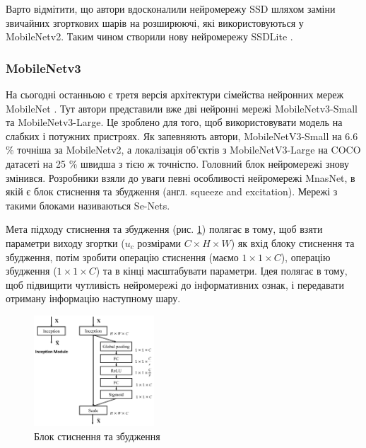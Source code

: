 Варто відмітити, що автори вдосконалили нейромережу SSD \cite{bib:ssd} шляхом заміни
звичайних згорткових шарів на розширюючі, які
використовуються у MobileNetv2. Таким чином створили нову нейромережу SSDLite \cite{bib:mobilenet:v2}.

\subsubsection{MobileNetv3}

На сьогодні останньою є третя версія архітектури сімейства нейронних мереж MobileNet \cite{bib:mobilenet:v3}.
Тут автори представили вже дві нейронні мережі MobileNetv3-Small та MobileNetv3-Large.
Це зроблено для того, щоб використовувати модель на слабких і потужних пристроях.
Як запевняють автори, MobileNetV3-Small на 6.6 \% точніша за MobileNetv2, а локалізація об'єктів
з MobileNetV3-Large на COCO датасеті на 25 \% швидша з тією  ж точністю.
Головний блок нейромережі знову змінився. Розробники взяли
до уваги певні особливості нейромережі MnasNet, в якій є блок стиснення та збудження
(англ. squeeze and excitation). Мережі з такими блоками називаються Se-Nets.

Мета підходу стиснення та збудження (рис. \ref{fig:cnn:senet_block}) полягає в тому, щоб взяти параметри
виходу згортки ($u_c$ розмірами $C \times H \times W$)
як вхід блоку стиснення та збудження,
потім зробити операцію стиснення (маємо $1 \times 1 \times C$), операцію збудження ($1 \times 1 \times C$) та
в кінці масштабувати параметри.
Ідея полягає в тому, щоб підвищити чутливість нейромережі до інформативних ознак,
і передавати отриману інформацію наступному шару.

\begin{figure}[H]
    \centering
    \includegraphics[width=0.4\textwidth]{images/cnn_senet_block}
    \caption{Блок стиснення та збудження      \cite{website:squeeze_and_excitation}
        \label{fig:cnn:senet_block}
    }
\end{figure}

